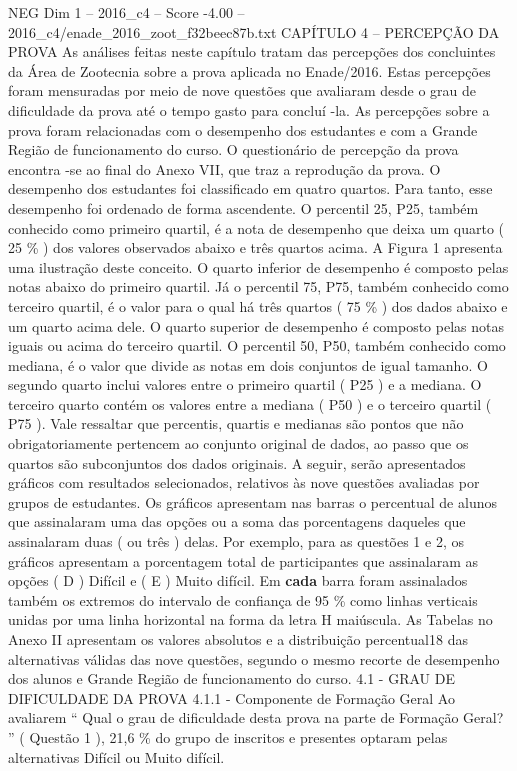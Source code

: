 \begin{textsample}{NEG Dim 1 – 2016\_c4 – Score -4.00 – 2016\_c4/enade\_2016\_zoot\_f32beec87b.txt}  \label{ex:f1_neg_152}
CAPÍTULO 4 – PERCEPÇÃO DA PROVA As análises feitas neste capítulo tratam das percepções dos concluintes da Área de Zootecnia sobre a prova aplicada no Enade/2016.
Estas percepções foram mensuradas por meio de nove questões que avaliaram desde o grau de dificuldade da prova até o tempo gasto para concluí -la.
As percepções sobre a prova foram relacionadas com o desempenho dos estudantes e com a Grande Região de funcionamento do curso.
O questionário de percepção da prova encontra -se ao final do Anexo VII, que traz a reprodução da prova.
O desempenho dos estudantes foi classificado em quatro quartos.
Para tanto, esse desempenho foi ordenado de forma ascendente.
O percentil 25, P25, também conhecido como primeiro quartil, é a nota de desempenho que deixa um quarto ( 25 \% ) dos valores observados abaixo e três quartos acima.
A Figura 1 apresenta uma ilustração deste conceito.
O quarto inferior de desempenho é composto pelas notas abaixo do primeiro quartil.
Já o percentil 75, P75, também conhecido como terceiro quartil, é o valor para o qual há três quartos ( 75 \% ) dos dados abaixo e um quarto acima dele.
O quarto superior de desempenho é composto pelas notas iguais ou acima do terceiro quartil.
O percentil 50, P50, também conhecido como mediana, é o valor que divide as notas em dois conjuntos de igual tamanho.
O segundo quarto inclui valores entre o primeiro quartil ( P25 ) e a mediana.
O terceiro quarto contém os valores entre a mediana ( P50 ) e o terceiro quartil ( P75 ).
Vale ressaltar que percentis, quartis e medianas são pontos que não obrigatoriamente pertencem ao conjunto original de dados, ao passo que os quartos são subconjuntos dos dados originais.
A seguir, serão apresentados gráficos com resultados selecionados, relativos às nove questões avaliadas por grupos de estudantes.
Os gráficos apresentam nas barras o percentual de alunos que assinalaram uma das opções ou a soma das porcentagens daqueles que assinalaram duas ( ou três ) delas.
Por exemplo, para as questões 1 e 2, os gráficos apresentam a porcentagem total de participantes que assinalaram as opções ( D ) Difícil e ( E ) Muito difícil.
Em \textbf{cada} barra foram assinalados também os extremos do intervalo de confiança de 95 \% como linhas verticais unidas por uma linha horizontal na forma da letra H maiúscula.
As Tabelas no Anexo II apresentam os valores absolutos e a distribuição percentual18 das alternativas válidas das nove questões, segundo o mesmo recorte de desempenho dos alunos e Grande Região de funcionamento do curso. 4.1 - GRAU DE DIFICULDADE DA PROVA 4.1.1 - Componente de Formação Geral Ao avaliarem “ Qual o grau de dificuldade desta prova na parte de Formação Geral? ” ( Questão 1 ), 21,6 \% do grupo de inscritos e presentes optaram pelas alternativas Difícil ou Muito difícil.

\end{textsample}
